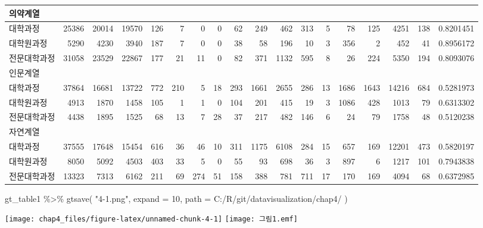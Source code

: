 \documentclass[
]{article}
\newenvironment{Shaded}{\begin{snugshade}}{\end{snugshade}}
\newcommand{\AttributeTok}[1]{\textcolor[rgb]{0.77,0.63,0.00}{#1}}
\newcommand{\DecValTok}[1]{\textcolor[rgb]{0.00,0.00,0.81}{#1}}
\newcommand{\FunctionTok}[1]{\textcolor[rgb]{0.00,0.00,0.00}{#1}}
\newcommand{\NormalTok}[1]{#1}
\newcommand{\SpecialCharTok}[1]{\textcolor[rgb]{0.00,0.00,0.00}{#1}}
\newcommand{\StringTok}[1]{\textcolor[rgb]{0.31,0.60,0.02}{#1}}
\begin{document}
\begin{longtable}{lrrrrrrrrrrrrrrrrr}
\midrule
\multicolumn{1}{l}{의약계열} \\ 
\midrule
대학과정 & 25386 & 20014 & 19570 & 126 & 7 & 0 & 0 & 62 & 249 & 462 & 313 & 5 & 78 & 125 & 4251 & 138 & 0.8201451 \\ 
대학원과정 & 5290 & 4230 & 3940 & 187 & 7 & 0 & 0 & 38 & 58 & 196 & 10 & 3 & 356 & 2 & 452 & 41 & 0.8956172 \\ 
전문대학과정 & 31058 & 23529 & 22867 & 177 & 21 & 11 & 0 & 82 & 371 & 1132 & 595 & 8 & 26 & 224 & 5350 & 194 & 0.8093076 \\ 
\midrule
\multicolumn{1}{l}{인문계열} \\ 
\midrule
대학과정 & 37864 & 16681 & 13722 & 772 & 210 & 5 & 18 & 293 & 1661 & 2655 & 286 & 13 & 1686 & 1643 & 14216 & 684 & 0.5281973 \\ 
대학원과정 & 4913 & 1870 & 1458 & 105 & 1 & 1 & 0 & 104 & 201 & 415 & 19 & 3 & 1086 & 428 & 1013 & 79 & 0.6313302 \\ 
전문대학과정 & 4438 & 1895 & 1525 & 68 & 13 & 7 & 28 & 37 & 217 & 482 & 146 & 6 & 24 & 79 & 1758 & 48 & 0.5120238 \\ 
\midrule
\multicolumn{1}{l}{자연계열} \\ 
\midrule
대학과정 & 37555 & 17648 & 15454 & 616 & 36 & 46 & 10 & 311 & 1175 & 6108 & 284 & 15 & 657 & 169 & 12201 & 473 & 0.5820197 \\ 
대학원과정 & 8050 & 5092 & 4503 & 403 & 33 & 5 & 0 & 55 & 93 & 698 & 36 & 3 & 897 & 6 & 1217 & 101 & 0.7943838 \\ 
전문대학과정 & 13323 & 7313 & 6162 & 211 & 69 & 274 & 51 & 158 & 388 & 781 & 711 & 17 & 170 & 169 & 4094 & 68 & 0.6372985 \\ 
 \bottomrule
\end{longtable}

\begin{Shaded}
\begin{Highlighting}[]
\NormalTok{gt\_table1 }\SpecialCharTok{\%\textgreater{}\%}
  \FunctionTok{gtsave}\NormalTok{(}
    \StringTok{"4{-}1.png"}\NormalTok{, }\AttributeTok{expand =} \DecValTok{10}\NormalTok{,}
    \AttributeTok{path =} \StringTok{\textquotesingle{}C:/R/git/datavisualization/chap4/\textquotesingle{}}
\NormalTok{  )}
\end{Highlighting}
\end{Shaded}

\texttt{[image: chap4\_files/figure-latex/unnamed-chunk-4-1]}
\texttt{[image: 그림1.emf]}
\end{document}
